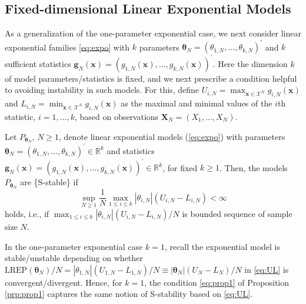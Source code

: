 \documentclass[]{article}
\theoremstyle{definition}
\newcommand{\REP}{\mathrm{LREP}}
\let\BeginKnitrBlock\begin \let\EndKnitrBlock\end
\begin{document}
\subsection{Fixed-dimensional Linear Exponential
Models}\label{fixed-dim-exp}

As a generalization of the one-parameter exponential case, we next
consider linear exponential families \eqref{eq:expo} with \(k\) parameters
\(\boldsymbol \theta_N = (\theta_{1,N},\ldots,\theta_{k,N})^\prime\) and
\(k\) sufficient statistics
\(\boldsymbol g_N(\boldsymbol x) = (g_{1,N}(\boldsymbol x),\ldots, g_{k,N}(\boldsymbol x))^\prime\).
Here the dimension \(k\) of model parameters/statistics is fixed, and we
next prescribe a condition helpful to avoiding instability in such
models. For this, define
\(U_{i,N}=\max_{\boldsymbol x \in\mathcal{X}^N} g_{i,N}(\boldsymbol x)\)
and
\(L_{i,N}=\min_{\boldsymbol x \in\mathcal{X}^N} g_{i,N}(\boldsymbol x)\)
as the maximal and minimal values of the \(i\)th statistic,
\(i=1,\ldots,k\), based on observations
\(\boldsymbol X_N=(X_1,\ldots,X_N)\).

\BeginKnitrBlock{proposition}
\protect\hypertarget{prp:prop1}{}{\label{prp:prop1}}Let
\(P_{\boldsymbol \theta_N}\), \(N \geq 1\), denote linear exponential
models (\ref{eq:expo}) with parameters
\(\boldsymbol \theta_N = (\theta_{1,N},\ldots,\theta_{k,N})^\prime \in \mathbb{R}^k\)
and statistics
\(\boldsymbol g_N(\boldsymbol x) = (g_{1,N}(\boldsymbol x),\ldots, g_{k,N}(\boldsymbol x))^\prime \in \mathbb{R}^k\),
for fixed \(k \geq 1\). Then, the models \(P_{\boldsymbol \theta_N}\)
are \{\rm S-stable\} if
\begin{equation}
\label{eq:prop1}
\sup_{N \geq 1}\frac{1}{N} \max_{1 \leq i \leq k }|\theta_{i,N}|(U_{i,N}-L_{i,N})<\infty
\end{equation}
holds, i.e., if
\(\max_{1 \leq i \leq k } |\theta_{i,N}|(U_{i,N}-L_{i,N})/N\) is bounded
sequence of sample size \(N\).
\EndKnitrBlock{proposition}

\BeginKnitrBlock{remark}
\iffalse <span class="remark"><em>Remark. \fi{} In the one-parameter
exponential case \(k=1\), recall the exponential model is
stable/unstable depending on whether
\(\REP(\boldsymbol \theta_N)/N = |\theta_{1,N}|(U_{1,N}-L_{1,N})/N \equiv |\boldsymbol \theta_{N}|(U_{N}-L_{N})/N\)
in \eqref{eq:UL} is convergent/divergent. Hence, for \(k=1\), the
condition \eqref{eq:prop1} of Proposition \ref{prp:prop1} captures the
same notion of S-stability based on \eqref{eq:UL}.
\EndKnitrBlock{remark}
\end{document}
